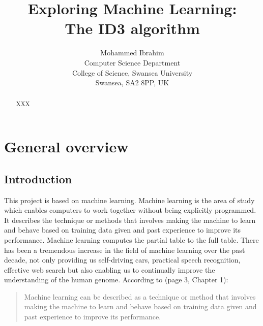 \documentclass{report}
\begin{document}
\title{Exploring Machine Learning:\\
  The ID3 algorithm}

\author{Mohammed Ibrahim\\
 Computer Science Department\\
  College of Science, Swansea University\\
  Swansea, SA2 8PP, UK
}

\maketitle
\begin{abstract}
  XXX
\end{abstract}

\tableofcontents



\chapter{General overview}
\label{cha:genoverview}


\section{Introduction}
\label{sec:int}

This project is based on machine learning. Machine learning is the area of study which enables computers to work together without being explicitly programmed. It describes the technique or methods that involves making the machine to learn and behave based on training data given and past experience to improve its performance. Machine learning computes the partial table to the full table.
There has been a tremendous increase in the field of machine learning over the past decade, not only providing us self-driving cars, practical speech recognition,  effective web search but also enabling us to continually improve the understanding of the human genome. According to \cite{Alpaydin2010MachineLearning}(page 3, Chapter 1):
\begin{quote}
  Machine learning can be described as a technique or method that involves making the machine to learn and behave based on training data given and past experience to improve its performance.
\end{quote}
\end{document}
